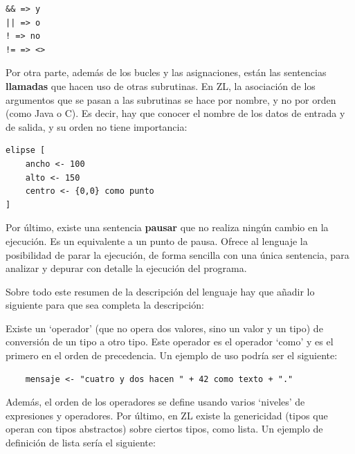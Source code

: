 \documentclass{report}
\begin{document}
	\vspace{10px}
	
\begin{BVerbatim}
&& => y 
|| => o
! => no 
!= => <>
\end{BVerbatim} 

	\vspace{10px} 
	
	Por otra parte, además de los bucles y las asignaciones, están las sentencias \textbf{llamadas} que hacen uso de otras subrutinas. En ZL, la asociación de los argumentos que se pasan a las subrutinas se hace por nombre, y no por orden (como Java o C). Es decir, hay que conocer el nombre de los datos de entrada y de salida, y su orden no tiene importancia:
	
	\vspace{10px}
	
\begin{BVerbatim}
elipse [
	ancho <- 100
	alto <- 150
	centro <- {0,0} como punto
]
\end{BVerbatim}	

	\vspace{10px}

	Por último, existe una sentencia \textbf{pausar} que no realiza ningún cambio en la ejecución. Es un equivalente a un punto de pausa. Ofrece al lenguaje la posibilidad de parar la ejecución, de forma sencilla con una única sentencia, para analizar y depurar con detalle la ejecución del programa.
	
	\vspace{10px}
	
	Sobre todo este resumen de la descripción del lenguaje hay que añadir lo siguiente para que sea completa la descripción:
	
		
	\noindent Existe un `operador' (que no opera dos valores, sino un valor y un tipo) de conversión de un tipo a otro tipo. Este operador es el operador `como' y es el primero en el orden de precedencia. Un ejemplo de uso podría ser el siguiente:
	
	\begin{BVerbatim}
	mensaje <- "cuatro y dos hacen " + 42 como texto + "."
	\end{BVerbatim} 
	
	Además, el orden de los operadores se define usando varios `niveles' de expresiones y operadores.
	Por último, en ZL existe la genericidad (tipos que operan con tipos abstractos) sobre ciertos tipos, como lista. Un ejemplo de definición de lista sería el siguiente:
	
\end{document}
